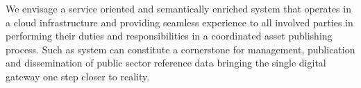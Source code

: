     We envisage a service oriented and semantically enriched system that operates in a cloud infrastructure and providing seamless experience to all involved parties in performing their duties and responsibilities in a  coordinated asset publishing process. Such as system can constitute a cornerstone for management, publication and dissemination of public sector reference data bringing the single digital gateway one step closer to reality. 
    
	
 
 
 
 
 
 
 
 
 
 

 